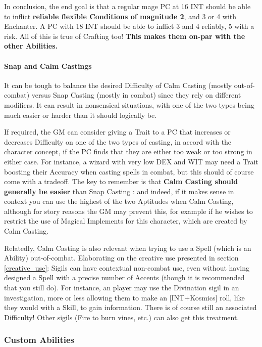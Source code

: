 In conclusion, the end goal is that a regular mage PC at 16 INT should be able to inflict \textbf{reliable flexible Conditions of magnitude 2}, and 3 or 4 with Enchanter. A PC with 18 INT should be able to inflict 3 and 4 reliably, 5 with a risk. All of this is true of Crafting too! \textbf{This makes them on-par with the other Abilities.}


\paragraph{Snap and Calm Castings}

It can be tough to balance the desired Difficulty of Calm Casting (mostly out-of-combat) versus Snap Casting (mostly in combat) since they rely on different modifiers. It can result in nonsensical situations, with one of the two types being much easier or harder than it should logically be.

If required, the GM can consider giving a Trait to a PC that increases or decreases Difficulty on one of the two types of casting, in accord with the character concept, if the PC finds that they are either too weak or too strong in either case. For instance, a wizard with very low DEX and WIT may need a Trait boosting their Accuracy when casting spells in combat, but this should of course come with a tradeoff. The key to remember is that \textbf{Calm Casting should generally be easier} than Snap Casting : and indeed, if it makes sense in context you can use the highest of the two Aptitudes when Calm Casting, although for story reasons the GM may prevent this, for example if he wishes to restrict the use of Magical Implements for this character, which are created by Calm Casting.

Relatedly, Calm Casting is also relevant when trying to use a Spell (which is an Ability) out-of-combat. Elaborating on the creative use presented in section \ref{creative_use}: Sigils can have contextual non-combat use, even without having designed a Spell with a precise number of Accents (though it is recommended that you still do). For instance, an player may use the Divination sigil in an investigation, more or less allowing them to make an [INT+Kosmics] roll, like they would with a Skill, to gain information. There is of course still an associated Difficulty! Other sigils (Fire to burn vines, etc.) can also get this treatment.


\subsubsection{Custom Abilities}

